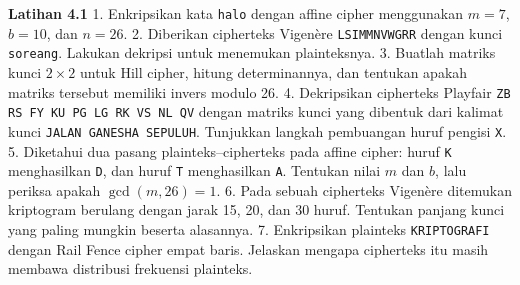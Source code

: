 
\begin{obereflection}
\textbf{Latihan 4.1}
1. Enkripsikan kata \texttt{halo} dengan affine cipher menggunakan $m=7$, $b=10$, dan $n=26$.
2. Diberikan cipherteks Vigen\`ere \texttt{LSIMMNVWGRR} dengan kunci \texttt{soreang}. Lakukan dekripsi untuk menemukan plainteksnya.
3. Buatlah matriks kunci $2 \times 2$ untuk Hill cipher, hitung determinannya, dan tentukan apakah matriks tersebut memiliki invers modulo 26.
4. Dekripsikan cipherteks Playfair \texttt{ZB RS FY KU PG LG RK VS NL QV} dengan matriks kunci yang dibentuk dari kalimat kunci \texttt{JALAN GANESHA SEPULUH}. Tunjukkan langkah pembuangan huruf pengisi \texttt{X}.
5. Diketahui dua pasang plainteks--cipherteks pada affine cipher: huruf \texttt{K} menghasilkan \texttt{D}, dan huruf \texttt{T} menghasilkan \texttt{A}. Tentukan nilai $m$ dan $b$, lalu periksa apakah $\gcd(m,26)=1$.
6. Pada sebuah cipherteks Vigen\`ere ditemukan kriptogram berulang dengan jarak 15, 20, dan 30 huruf. Tentukan panjang kunci yang paling mungkin beserta alasannya.
7. Enkripsikan plainteks \texttt{KRIPTOGRAFI} dengan Rail Fence cipher empat baris. Jelaskan mengapa cipherteks itu masih membawa distribusi frekuensi plainteks.
\end{obereflection}
